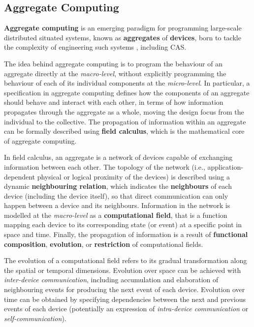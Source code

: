 
\subsection{Aggregate Computing}
\label{section:background:concepts:aggregate-computing}

\textbf{Aggregate computing} is an emerging paradigm for programming large-scale
distributed situated systems, known as \textbf{aggregates} of \textbf{devices},
born to tackle the complexity of engineering such systems
\cite{FieldCalculus-AggregateComputing}, including \ac{CAS}.

The idea behind aggregate computing is to program the behaviour of an aggregate
directly at the \textit{macro-level}, without explicitly programming the
behaviour of each of its individual components at the \textit{micro-level}. In
particular, a specification in aggregate computing defines how the components
of an aggregate should behave and interact with each other, in terms of how
information propagates through the aggregate as a whole, moving the design
focus from the individual to the collective. The propagation of information
within an aggregate can be formally described using \textbf{field calculus},
which is the mathematical core of aggregate computing.

In field calculus, an aggregate is a network of devices capable of exchanging
information between each other. The topology of the network (i.e.,
application-dependent physical or logical proximity of the devices) is
described using a dynamic \textbf{neighbouring relation}, which indicates the
\textbf{neighbours} of each device (including the device itself), so that
direct communication can only happen between a device and its neighbours.
Information in the network is modelled at the \textit{macro-level} as a
\textbf{computational field}, that is a function mapping each device to its
corresponding state (or event) at a specific point in space and time. Finally,
the propagation of information is a result of \textbf{functional composition},
\textbf{evolution}, or \textbf{restriction} of computational fields.

The evolution of a computational field refers to its gradual transformation
along the spatial or temporal dimensions. Evolution over space can be achieved
with \textit{inter-device communication}, including accumulation and
elaboration of neighbouring events for producing the next event of each device.
Evolution over time can be obtained by specifying dependencies between the next
and previous events of each device (potentially an expression of
\textit{intra-device communication} or \textit{self-communication}).

